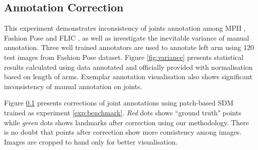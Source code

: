 \subsection{Annotation Correction}
\label{exp:qualitative}

This experiment demonstrates inconsistency of joints annotation among MPII \cite{andriluka14cvpr}, Fashion Pose \cite{dantone2013human} and FLIC \cite{sapp2013modec}, as well as investigate the inevitable variance of manual annotation. Three well trained annotators are used to annotate left arm using 120 test images from Fashion Pose \cite{dantone2013human} dataset. Figure \ref{fig:variance} presents statistical results calculated using data annotated and officially provided with normalisation based on length of arms. Exemplar annotation visualisation also shows significant inconsistency of manual annotation on joints.

Figure \ref{exp:qualitative} presents corrections of joint annotations using patch-based SDM trained as experiment \ref{exp:benchmark}. \emph{Red} dots shows ``ground truth" points while \emph{green} dots shows landmarks after correction using our methodology. There is no doubt that points after correction show more consistency among images. Images are cropped to hand only for better visualisation.
